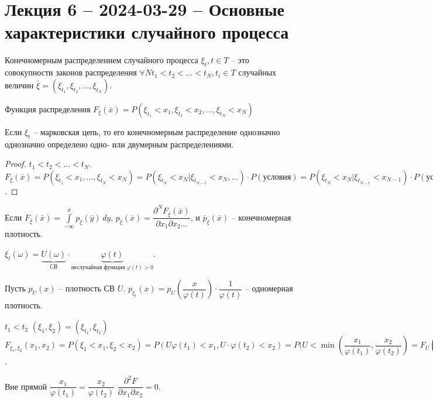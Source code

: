 \section{Лекция 6 -- 2024-03-29 -- Основные характеристики случайного процесса}

\begin{definition}
  Конечномерным распределением случайного процесса $\xi_t, t\in T$ -- это
  совокупности законов распределения $\forall N t_1 < t_2 < \dots < t_N, t_i \in T$
  случайных величин $\bar{\xi} = (\xi_{t_1}, \xi_{t_2}, \dots, \xi_{t_N})$.

  Функция распределения $F_\bar{\xi}(\bar{x}) = P(\xi_{t_1} < x_1, \xi_{t_2} < x_2, \dots, \xi_{t_N} < x_N)$
\end{definition}


\begin{theorem}
  Если $\xi_t$ -- марковская цепь, то его конечномерным распределение однозначно 
  однозначно определено одно- или двумерным распределениями.
\end{theorem}
\begin{proof}
  $t_1 < t_2 < \dots < t_N$. $F_\bar{\xi} (\bar{x}) = P(\xi_{t_1} < x_1, \dots, \xi_{t_N} < x_N)
  = P(\xi_{t_N} < x_N | \xi_{t_{N-1}} < x_{N}, \dots) \cdot P(\text{условия}) = P(\xi_{t_N} < x_N | \xi_{t_{N-1}} < x_{N-1}) \cdot P(\text{условия})$.
\end{proof}

\begin{definition}
  Если $F_{\bar{\xi}}(\bar{x}) = \int\limits_{-\infty}^{\bar{x}} p_{\bar{\xi}} (\bar{y}) \, dy$,
  $p_{\bar{\xi}} (\bar{x}) = \dfrac{\partial^N F_{\bar{\xi}} (\bar{x})}{\partial x_1 \partial x_2 \dots}$, и $\bar{p}_\bar{\xi} (\bar{x})$ -- конечномерная плотность.
\end{definition}

\begin{ex}
  $\xi_t (\omega) = \underbrace{U(\omega)}_\text{СВ} \cdot \underbrace{\varphi(t)}_\text{неслучайная функция $\varphi(t) > 0$}$.

  Пусть $p_U (x)$ -- плотность СВ $U$. $p_{\xi_t} (x) = p_U \left(\dfrac{x}{\varphi(t)}\right) \cdot \dfrac{1}{\varphi(t)}$ -- одномерная плотность.

  $t_1 < t_2$ $(\xi_1, \xi_2) = (\xi_{t_1}, \xi_{t_2})$
  $F_{\xi_1, \xi_2} (x_1, x_2) = P(\xi_1 < x_1, \xi_2 < x_2) = P(U\varphi(t_1) < x_1, U\cdot\varphi(t_2) < x_2) = P(U < \min \left(\dfrac{x_1}{\varphi(t_1)}, \dfrac{x_2}{\varphi(t_2)}\right)
  = F_U \left( \dfrac{x_1}{\varphi(t_1)}, \dfrac{x_2}{\varphi(t_2)} \right)$.

  Вне прямой $\dfrac{x_1}{\varphi(t_1)} = \dfrac{x_2}{\varphi(t_2)}$ $ \dfrac{\partial^2 F}{\partial x_1 \partial x_2} = 0$.
\end{ex}

